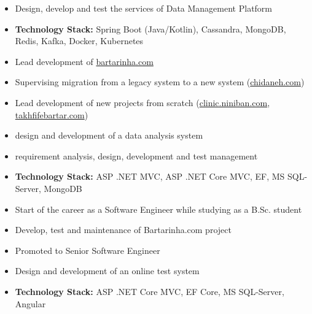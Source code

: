 \documentclass[10pt,a4paper,ragged2e,withhyper]{altacv}
\begin{document}
\begin{paracol}{2}

\begin{itemize}
\item Design, develop and test the services of Data Management Platform
\item \textbf{Technology Stack:} Spring Boot (Java/Kotlin), Cassandra, MongoDB, Redis, Kafka, Docker, Kubernetes
\end{itemize}

\divider

\begin{itemize}
\item Lead development of \href{https://bartarinha.com}{bartarinha.com}
\item Supervising migration from a legacy system to a new system (\href{https://chidaneh.com}{chidaneh.com})
\item Lead development of new projects from scratch (\href{https://clinic.niniban.com}{clinic.niniban.com}, \href{https://takhfifebartar.com}{takhfifebartar.com})
\item design and development of a data analysis system
\item requirement analysis, design, development and test management
\item \textbf{Technology Stack:} ASP .NET MVC, ASP .NET Core MVC, EF, MS SQL-Server, MongoDB
\end{itemize}

\divider

\begin{itemize}
\item Start of the career as a Software Engineer while studying as a B.Sc. student
\item Develop, test and maintenance of Bartarinha.com project
\item Promoted to Senior Software Engineer
\end{itemize}


\begin{itemize}
\item Design and development of an online test system
\item\textbf{Technology Stack:} ASP .NET Core MVC, EF Core, MS SQL-Server, Angular
\end{itemize}


\end{paracol}
\end{document}
